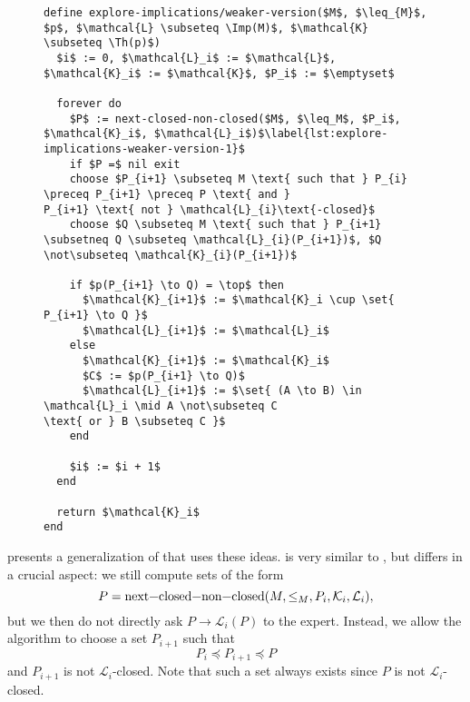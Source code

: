\begin{figure}[tp]
  \begin{Algorithm}
    \label{alg:explore-implications-weaker-version}
    \hspace*{0cm}
\begin{lstlisting}
define explore-implications/weaker-version($M$, $\leq_{M}$, $p$, $\mathcal{L} \subseteq \Imp(M)$, $\mathcal{K} \subseteq \Th(p)$)
  $i$ := 0, $\mathcal{L}_i$ := $\mathcal{L}$, $\mathcal{K}_i$ := $\mathcal{K}$, $P_i$ := $\emptyset$

  forever do
    $P$ := next-closed-non-closed($M$, $\leq_M$, $P_i$, $\mathcal{K}_i$, $\mathcal{L}_i$)$\label{lst:explore-implications-weaker-version-1}$
    if $P =$ nil exit
    choose $P_{i+1} \subseteq M \text{ such that } P_{i} \preceq P_{i+1} \preceq P \text{ and }
P_{i+1} \text{ not } \mathcal{L}_{i}\text{-closed}$
    choose $Q \subseteq M \text{ such that } P_{i+1} \subsetneq Q \subseteq \mathcal{L}_{i}(P_{i+1})$, $Q \not\subseteq \mathcal{K}_{i}(P_{i+1})$

    if $p(P_{i+1} \to Q) = \top$ then
      $\mathcal{K}_{i+1}$ := $\mathcal{K}_i \cup \set{ P_{i+1} \to Q }$
      $\mathcal{L}_{i+1}$ := $\mathcal{L}_i$
    else
      $\mathcal{K}_{i+1}$ := $\mathcal{K}_i$
      $C$ := $p(P_{i+1} \to Q)$
      $\mathcal{L}_{i+1}$ := $\set{ (A \to B) \in \mathcal{L}_i \mid A \not\subseteq C
\text{ or } B \subseteq C }$
    end

    $i$ := $i + 1$
  end

  return $\mathcal{K}_i$  
end
\end{lstlisting}
  \end{Algorithm}
\end{figure}

 presents a generalization of
 that uses these ideas.
 is very similar to
, but differs in a crucial aspect: we still compute sets of
the form
\begin{equation*}
  P = \text{\lstinline{next-closed-non-closed}}(M, \leq_{M}, P_{i}, \mathcal{K}_{i}, \mathcal{L}_{i}),
\end{equation*}
but we then do not directly ask $P \to \mathcal{L}_{i}(P)$ to the expert.  Instead, we
allow the algorithm to choose a set $P_{i+1}$ such that
\begin{equation*}
  P_{i} \preceq P_{i+1} \preceq P
\end{equation*}
and $P_{i+1}$ is not $\mathcal{L}_{i}$-closed.  Note that such a set always exists since
$P$ is not $\mathcal{L}_{i}$-closed.

